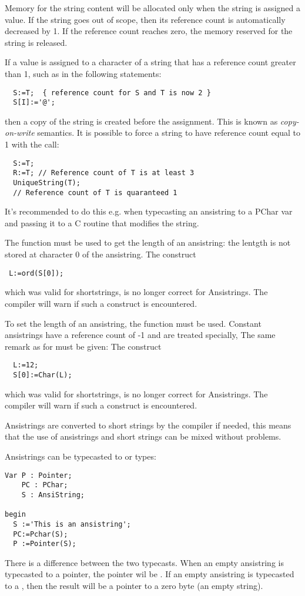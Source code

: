 Memory for the string content will be allocated only when the string is 
assigned a value. If the string goes out of scope, then its reference 
count is automatically  decreased by 1. If the reference count reaches 
zero, the memory reserved for the string is released.

If a value is assigned to a character of a string that has a reference count
greater than 1, such as in the following
statements:
\begin{verbatim}
  S:=T;  { reference count for S and T is now 2 }
  S[I]:='@';
\end{verbatim}
then a copy of the string is created before the assignment. This is known
as {\em copy-on-write} semantics. It is possible to force a string to have
reference count equal to 1 with the  call:
\begin{verbatim}
  S:=T;
  R:=T; // Reference count of T is at least 3
  UniqueString(T); 
  // Reference count of T is quaranteed 1
\end{verbatim}
It's recommended to do this e.g. when typecasting an ansistring to a PChar var
and passing it to a C routine that modifies the string.

The  function must be used to get the length of an
ansistring: the lentgth is not stored at character 0 of the ansistring. The
construct
\begin{verbatim}
 L:=ord(S[0]);
\end{verbatim}
which was valid for \tp shortstrings, is no longer correct for
Ansistrings. The compiler will warn if such a construct is encountered.

To set the length of an ansistring, the  function must be used.
Constant ansistrings have a reference count of -1 and are treated specially,
The same remark as for  must be given: The construct
\begin{verbatim}
  L:=12;
  S[0]:=Char(L);
\end{verbatim}
which was valid for \tp shortstrings, is no longer correct for
Ansistrings. The compiler will warn if such a construct is encountered.

Ansistrings are converted to short strings by the compiler if needed,
this means that the use of ansistrings and short strings can be mixed
without problems.

Ansistrings can be typecasted to  or  types:
\begin{verbatim}
Var P : Pointer;
    PC : PChar;
    S : AnsiString;

begin
  S :='This is an ansistring';
  PC:=Pchar(S);
  P :=Pointer(S);
\end{verbatim}
There is a difference between the two typecasts. When an empty
ansistring is typecasted to a pointer, the pointer wil be . If an
empty ansistring is typecasted to a , then the result will be a pointer to a
zero byte (an empty string).

